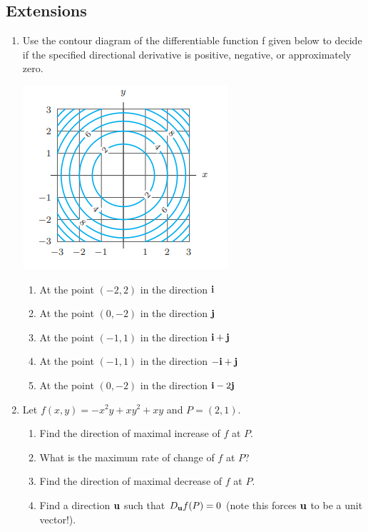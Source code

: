 \subsection*{Extensions}
\begin{enumerate}[resume]
	\item Use the contour diagram of the differentiable function f given below to decide if
	the specified directional derivative is positive, negative, or approximately zero.
	
	\begin{minipage}{0.3\linewidth}
		\includegraphics[scale=0.7]{contour_14_5.png}
	\end{minipage}
	\begin{minipage}{0.6\linewidth}	
		\begin{enumerate}
			\item At the point $(-2,2)$ in the direction $\mathbf{i}$
			\item At the point $(0,-2)$ in the direction $\mathbf{j}$
			\item At the point $(-1,1)$ in the direction $\mathbf{i} +\mathbf{j}$
			\item At the point $(-1,1)$ in the direction $-\mathbf{i}+\mathbf{j}$
			\item At the point $(0,-2)$ in the direction $\mathbf{i} - 2\mathbf{j}$
		\end{enumerate}
	\end{minipage}

	\item Let $f(x,y)=-x^2y+xy^2+xy$ and $P=(2,1)$.
	\begin{enumerate}
		\item Find the direction of maximal increase of $f$ at $P$.
		\item What is the maximum rate of change of $f$ at $P$?
		\item Find the direction of maximal decrease of $f$ at $P$.
		\item Find a direction $\mathbf{u}$ such that $D_{\mathbf{u}}f(P)=0$ (note this forces $\mathbf{u}$ to be a unit vector!).
	\end{enumerate}
\end{enumerate}
{}

